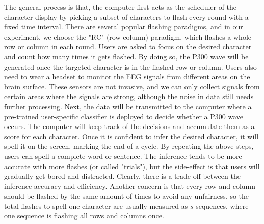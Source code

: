 \documentclass{article}
\begin{document}
\vspace{-3mm}
The general process is that, the computer first acts as the scheduler of the character display by picking a subset of characters to flash every round with a fixed time interval. There are several popular flashing paradigms, and in our experiment, we choose the "RC" (row-column) paradigm, which flashes a whole row or column in each round. Users are asked to focus on the desired character and count how many times it gets flashed. By doing so, the P300 wave will be generated once the targeted character is in the flashed row or column. Users also need to wear a headset to monitor the EEG signals from different areas on the brain surface. These sensors are not invasive, and we can only collect signals from certain areas where the signals are strong, although the noise in data still needs further processing. Next, the data will be transmitted to the computer where a pre-trained user-specific classifier is deployed to decide whether a P300 wave occurs. The computer will keep track of the decisions and accumulate them as a score for each character. Once it is confident to infer the desired character, it will spell it on the screen, marking the end of a cycle. By repeating the above steps, users can spell a complete word or sentence. The inference tends to be more accurate with more flashes (or called "trials"), but the side-effect is that users will gradually get bored and distracted. Clearly, there is a trade-off between the inference accuracy and efficiency. Another concern is that every row and column should be flashed by the same amount of times to avoid any unfairness, so the total flashes to spell one character are usually measured as $s$ sequences, where one sequence is flashing all rows and columns once.
\end{document}
